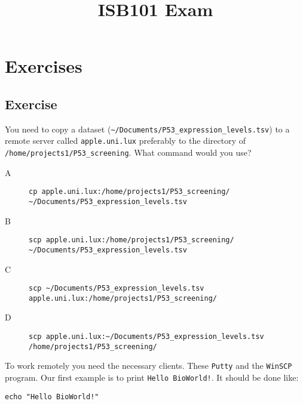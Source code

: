 \documentclass{article}\usepackage[]{graphicx}\usepackage[usenames,dvipsnames]{color}
\title{ISB101 Exam}
\begin{document}
\maketitle

\addtocounter{ExerciseNr}{1}

\section{Exercises} \label{sec:exercises}

\subsection{Exercise }

You need to copy a dataset (\verb+~/Documents/P53_expression_levels.tsv+) to a remote server called \verb+apple.uni.lux+ preferably to the directory of \verb+/home/projects1/P53_screening+. What command would you use?

\begin{description}
  \item[A] \verb+cp apple.uni.lux:/home/projects1/P53_screening/ ~/Documents/P53_expression_levels.tsv+
  \item[B] \verb+scp apple.uni.lux:/home/projects1/P53_screening/ ~/Documents/P53_expression_levels.tsv+
  \item[C] \verb+scp ~/Documents/P53_expression_levels.tsv apple.uni.lux:/home/projects1/P53_screening/+
  \item[D] \verb+scp apple.uni.lux:~/Documents/P53_expression_levels.tsv /home/projects1/P53_screening/+
\end{description}

To work remotely you need the necessary clients. These \verb+Putty+ and the \verb+WinSCP+ program. Our first example is to print \verb+Hello BioWorld!+. It should be done like:

\begin{verbatim}
echo "Hello BioWorld!"
\end{verbatim}
\end{document}
